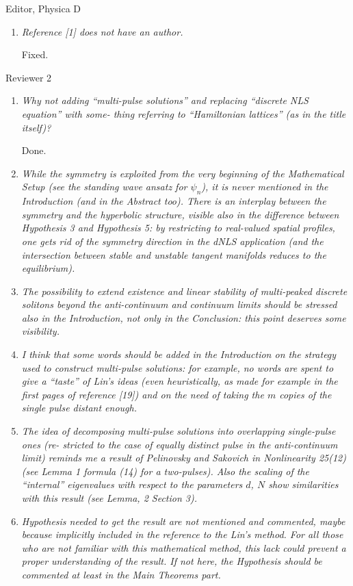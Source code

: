 \documentclass[11pt]{letter}
\begin{document}
\begin{letter}{Editor, Physica D}
\begin{enumerate}
\item \emph{Reference [1] does not have an author.}

Fixed.

\end{enumerate}

Reviewer 2
\begin{enumerate}
\item \emph{Why not adding ``multi-pulse solutions'' and replacing ``discrete NLS equation'' with some- thing referring to ``Hamiltonian lattices'' (as in the title itself)? }

Done.

\item \emph{While the symmetry is exploited from the very beginning of the Mathematical Setup (see the standing wave ansatz for $\psi_n$), it is never mentioned in the Introduction (and in the Abstract too). There is an interplay between the symmetry and the hyperbolic structure, visible also in the difference between Hypothesis 3 and Hypothesis 5: by restricting to real-valued spatial profiles, one gets rid of the symmetry direction in the dNLS application (and the intersection between stable and unstable tangent manifolds reduces to the equilibrium).}

\item \emph{The possibility to extend existence and linear stability of multi-peaked discrete solitons beyond the anti-continuum and continuum limits should be stressed also in the Introduction, not only in the Conclusion: this point deserves some visibility.}

\item \emph{I think that some words should be added in the Introduction on the strategy used to construct multi-pulse solutions: for example, no words are spent to give a “taste” of Lin’s ideas (even heuristically, as made for example in the first pages of reference [19]) and on the need of taking the $m$ copies of the single pulse distant enough.}

\item \emph{The idea of decomposing multi-pulse solutions into overlapping single-pulse ones (re- stricted to the case of equally distinct pulse in the anti-continuum limit) reminds me a result of Pelinovsky and Sakovich in Nonlinearity 25(12) (see Lemma 1 formula (14) for a two-pulses). Also the scaling of the ``internal'' eigenvalues with respect to the parameters $d$, $N$ show similarities with this result (see Lemma, 2 Section 3).}

\item \emph{Hypothesis needed to get the result are not mentioned and commented, maybe because implicitly included in the reference to the Lin’s method. For all those who are not familiar with this mathematical method, this lack could prevent a proper understanding of the result. If not here, the Hypothesis should be commented at least in the Main Theorems part.}


\end{enumerate}
\end{letter}
\end{document}
